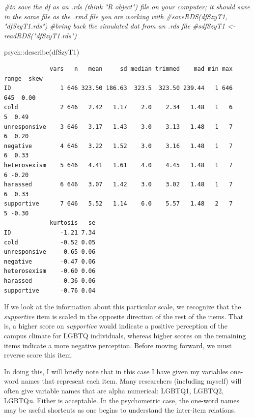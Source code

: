 \documentclass[
  english,
]{book}
\newenvironment{Shaded}{\begin{snugshade}}{\end{snugshade}}
\newcommand{\CommentTok}[1]{\textcolor[rgb]{0.56,0.35,0.01}{\textit{#1}}}
\newcommand{\FunctionTok}[1]{\textcolor[rgb]{0.00,0.00,0.00}{#1}}
\newcommand{\NormalTok}[1]{#1}
\newcommand{\SpecialCharTok}[1]{\textcolor[rgb]{0.00,0.00,0.00}{#1}}
\begin{document}
\begin{Shaded}
\begin{Highlighting}[]
\CommentTok{\#to save the df as an .rds (think "R object") file on your computer; it should save in the same file as the .rmd file you are working with}
\CommentTok{\#saveRDS(dfSzyT1, "dfSzyT1.rds")}
\CommentTok{\#bring back the simulated dat from an .rds file}
\CommentTok{\#sdfSzyT1 \textless{}{-} readRDS("dfSzyT1.rds")}
\end{Highlighting}
\end{Shaded}

\begin{Shaded}
\begin{Highlighting}[]
\NormalTok{psych}\SpecialCharTok{::}\FunctionTok{describe}\NormalTok{(dfSzyT1)}
\end{Highlighting}
\end{Shaded}

\begin{verbatim}
             vars   n   mean     sd median trimmed    mad min max range  skew
ID              1 646 323.50 186.63  323.5  323.50 239.44   1 646   645  0.00
cold            2 646   2.42   1.17    2.0    2.34   1.48   1   6     5  0.49
unresponsive    3 646   3.17   1.43    3.0    3.13   1.48   1   7     6  0.20
negative        4 646   3.22   1.52    3.0    3.16   1.48   1   7     6  0.33
heterosexism    5 646   4.41   1.61    4.0    4.45   1.48   1   7     6 -0.20
harassed        6 646   3.07   1.42    3.0    3.02   1.48   1   7     6  0.33
supportive      7 646   5.52   1.14    6.0    5.57   1.48   2   7     5 -0.30
             kurtosis   se
ID              -1.21 7.34
cold            -0.52 0.05
unresponsive    -0.65 0.06
negative        -0.47 0.06
heterosexism    -0.60 0.06
harassed        -0.36 0.06
supportive      -0.76 0.04
\end{verbatim}

If we look at the information about this particular scale, we recognize that the \emph{supportive} item is scaled in the opposite direction of the rest of the items. That is, a higher score on \emph{supportive} would indicate a positive perception of the campus climate for LGBTQ individuals, whereas higher scores on the remaining items indicate a more negative perception. Before moving forward, we must reverse score this item.

In doing this, I will briefly note that in this case I have given my variables one-word names that represent each item. Many researchers (including myself) will often give variable names that are alpha numerical: LGBTQ1, LGBTQ2, LGBTQ\emph{n}. Either is acceptable. In the psychometric case, the one-word names may be useful shortcuts as one begins to understand the inter-item relations.
\end{document}
